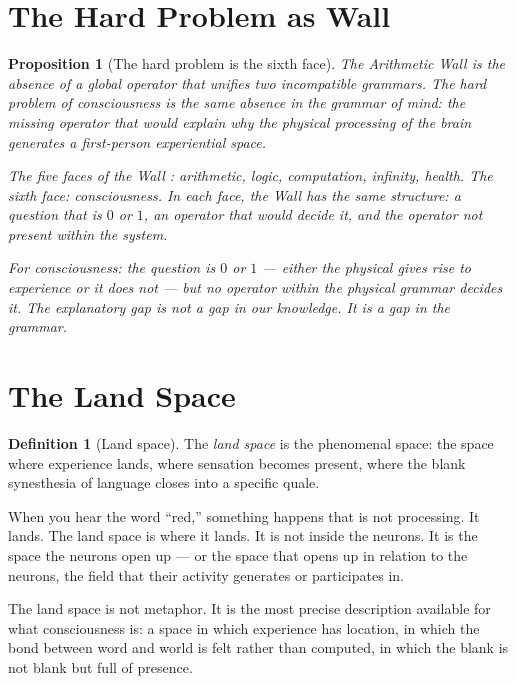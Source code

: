 \documentclass[12pt]{article}
\newtheorem{proposition}[theorem]{Proposition}
\theoremstyle{definition}
\newtheorem{definition}[theorem]{Definition}
\theoremstyle{remark}
\begin{document}
\section{The Hard Problem as Wall}

\begin{proposition}[The hard problem is the sixth face]
The Arithmetic Wall \cite{synthesis} is the absence of a global operator
that unifies two incompatible grammars.
The hard problem of consciousness is the same absence
in the grammar of mind:
the missing operator that would explain
why the physical processing of the brain
generates a first-person experiential space.

The five faces of the Wall \cite{five}:
arithmetic, logic, computation, infinity, health.
The sixth face: consciousness.
In each face, the Wall has the same structure:
a question that is $0$ or $1$,
an operator that would decide it,
and the operator not present within the system.

For consciousness: the question is $0$ or $1$ ---
either the physical gives rise to experience or it does not ---
but no operator within the physical grammar decides it.
The explanatory gap is not a gap in our knowledge.
It is a gap in the grammar.
\end{proposition}

\section{The Land Space}

\begin{definition}[Land space]
The \emph{land space} is the phenomenal space:
the space where experience lands,
where sensation becomes present,
where the blank synesthesia \cite{chimera} of language
closes into a specific quale.

When you hear the word ``red,''
something happens that is not processing.
It lands. The land space is where it lands.
It is not inside the neurons.
It is the space the neurons open up ---
or the space that opens up in relation to the neurons,
the field that their activity generates or participates in.

The land space is not metaphor.
It is the most precise description available
for what consciousness is:
a space in which experience has location,
in which the bond between word and world
is felt rather than computed,
in which the blank is not blank but full of presence.
\end{definition}
\end{document}
